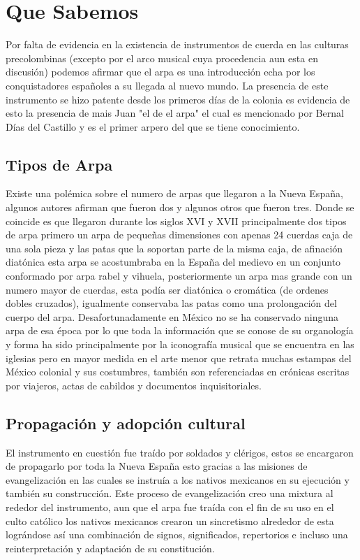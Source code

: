 \section{Que Sabemos}
Por falta de evidencia en la existencia de instrumentos de cuerda en las culturas precolombinas (excepto por el arco musical cuya procedencia aun esta en discusión) podemos afirmar que el arpa es una introducción echa por los conquistadores españoles a su llegada al nuevo mundo. La presencia de este instrumento se hizo patente desde los primeros días de la colonia es evidencia de esto la presencia  de mais Juan "el de el arpa" el cual es mencionado por Bernal Días del Castillo y es el primer arpero del que se tiene conocimiento.

\subsection{Tipos de Arpa}

Existe una polémica sobre el numero de arpas que llegaron a la Nueva España, algunos autores afirman que fueron dos y algunos otros que fueron tres. Donde se coincide es que llegaron durante los siglos XVI y XVII principalmente dos tipos de arpa primero un arpa de pequeñas dimensiones con apenas 24 cuerdas caja de una sola pieza y las patas que la soportan parte de la misma caja, de afinación  diatónica esta arpa se acostumbraba en la España del medievo en un conjunto conformado por arpa rabel y vihuela, posteriormente un arpa mas grande con un numero mayor de cuerdas, esta podía ser diatónica o cromática (de ordenes dobles cruzados), igualmente conservaba las patas como una prolongación del cuerpo del arpa.  Desafortunadamente en México no se ha conservado ninguna arpa de esa época por lo que toda la información que se conose de su organología y forma ha sido principalmente por la iconografía musical que se encuentra en las iglesias pero en mayor medida en el arte menor que retrata muchas estampas del México colonial y sus costumbres, también son referenciadas en crónicas escritas por viajeros, actas de cabildos y documentos inquisitoriales.

\subsection{Propagación y adopción cultural}

El instrumento en cuestión fue traído por soldados y clérigos, estos se encargaron de propagarlo por toda la Nueva España esto gracias a las misiones de evangelización en las cuales se instruía a los nativos mexicanos en su ejecución y también su construcción. Este proceso de evangelización creo una mixtura al rededor del instrumento, aun que el arpa fue traída con el fin de su uso en el culto católico los nativos mexicanos crearon un sincretismo alrededor de esta lográndose así una combinación de signos, significados, repertorios e incluso una reinterpretación y adaptación de su constitución.